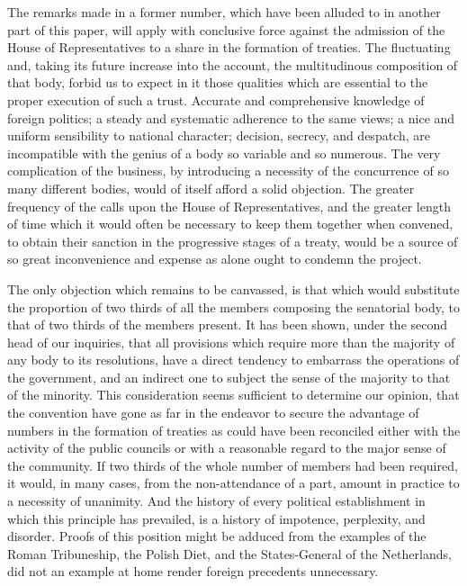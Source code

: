 The remarks made in a former number, which have been alluded to in another part of this paper, will apply with conclusive force against the admission of the House of Representatives to a share in the formation of treaties. The fluctuating and, taking its future increase into the account, the multitudinous composition of that body, forbid us to expect in it those qualities which are essential to the proper execution of such a trust. Accurate and comprehensive knowledge of foreign politics; a steady and systematic adherence to the same views; a nice and uniform sensibility to national character; decision, secrecy, and despatch, are incompatible with the genius of a body so variable and so numerous. The very complication of the business, by introducing a necessity of the concurrence of so many different bodies, would of itself afford a solid objection. The greater frequency of the calls upon the House of Representatives, and the greater length of time which it would often be necessary to keep them together when convened, to obtain their sanction in the progressive stages of a treaty, would be a source of so great inconvenience and expense as alone ought to condemn the project.

The only objection which remains to be canvassed, is that which would substitute the proportion of two thirds of all the members composing the senatorial body, to that of two thirds of the members present. It has been shown, under the second head of our inquiries, that all provisions which require more than the majority of any body to its resolutions, have a direct tendency to embarrass the operations of the government, and an indirect one to subject the sense of the majority to that of the minority. This consideration seems sufficient to determine our opinion, that the convention have gone as far in the endeavor to secure the advantage of numbers in the formation of treaties as could have been reconciled either with the activity of the public councils or with a reasonable regard to the major sense of the community. If two thirds of the whole number of members had been required, it would, in many cases, from the non-attendance of a part, amount in practice to a necessity of unanimity. And the history of every political establishment in which this principle has prevailed, is a history of impotence, perplexity, and disorder. Proofs of this position might be adduced from the examples of the Roman Tribuneship, the Polish Diet, and the States-General of the Netherlands, did not an example at home render foreign precedents unnecessary.

